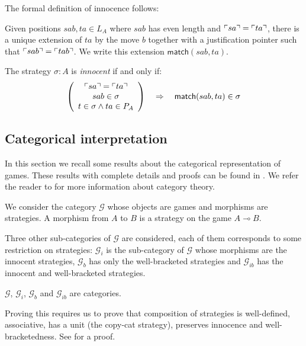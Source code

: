 The formal definition of innocence follows:
\begin{dfn}[Innocence]
Given positions $sab, ta \in L_A$ where $sab$ has even length and
$\ulcorner sa \urcorner = \ulcorner ta \urcorner$, there is a unique extension of $ta$ by
the move $b$ together with a justification pointer such that
$\ulcorner sab \urcorner = \ulcorner tab \urcorner$. We write this extension
$\textsf{match}(sab,ta)$.

The strategy $\sigma:A$ is \emph{innocent} if and only if:
$$ \left(
     \begin{array}{c}
       \ulcorner sa \urcorner = \ulcorner ta \urcorner \\
       sab \in \sigma \\
       t\in \sigma \wedge ta \in P_A \\
     \end{array}
   \right)
\quad \Rightarrow\quad  \textsf{match}(sab,ta) \in \sigma$$

\end{dfn}


\subsection{Categorical interpretation}

In this section we recall some results about the categorical
representation of games. These results with complete details and
proofs can be found in \cite{McC96b,hylandong_pcf,abramsky94full}.
We refer the reader to \cite{CroleRL:catt} for more information
about category theory.

We consider the category $\mathcal{G}$ whose objects are games and morphisms are
strategies. A morphism from $A$ to $B$ is a strategy on the game $A \multimap B$.

Three other sub-categories of $\mathcal{G}$ are considered, each of
them corresponds to some restriction on strategies: $\mathcal{G}_i$
is the sub-category of $\mathcal{G}$ whose morphisms are the
innocent strategies, $\mathcal{G}_b$ has only the well-bracketed
strategies and $\mathcal{G}_{ib}$ has the innocent and
well-bracketed strategies.

\begin{prop}
$\mathcal{G}$, $\mathcal{G}_i$, $\mathcal{G}_b$ and $\mathcal{G}_{ib}$ are categories.
\end{prop}

Proving this requires us to prove that composition of strategies is
well-defined, associative, has a unit (the copy-cat strategy),
preserves innocence and well-bracketedness. See
\cite{hylandong_pcf,abramsky94full} for a proof.


